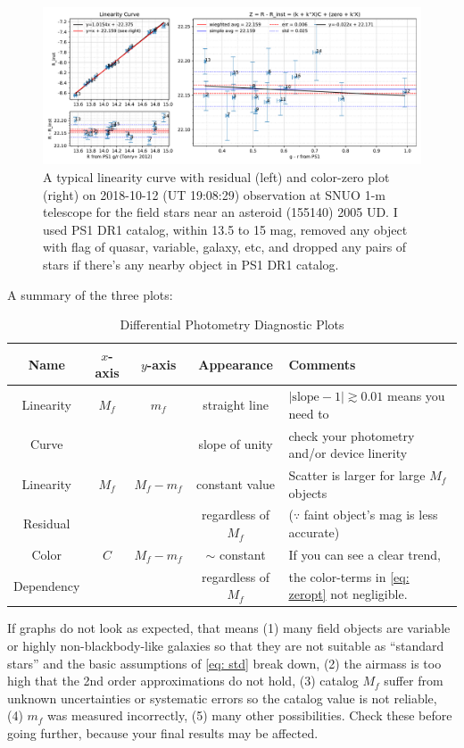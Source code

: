 \begin{figure}[ht!]
\centering
\includegraphics[width=\linewidth]{figs/SNUO_STX16803-2005UD-1-1-20181012-190829_zeropoint.pdf}
\caption{A typical linearity curve with residual (left) and color-zero plot (right) on 2018-10-12 (UT 19:08:29) observation at SNUO 1-m telescope for the field stars near an asteroid (155140) 2005 UD. I used PS1 DR1 catalog, within 13.5 to 15 mag, removed any object with flag of quasar, variable, galaxy, etc, and dropped any pairs of stars if there's any nearby object in PS1 DR1 catalog.}
\label{fig:zeropt}
\end{figure}

A summary of the three plots:
\begin{table}[ht!]
\caption{Differential Photometry Diagnostic Plots}
\label{tab: 1-filter diff phot}
\centering
  \begin{tabular}{c|cc|c|l}
  Name & $ x $-axis & $ y $-axis & Appearance & Comments \\
  \hline
  Linearity & $ M_f $ & $ m_f $       & straight line & 
  $ |\mathrm{slope} - 1| \gtrsim 0.01 $ means you need to \\
  Curve & & & slope of unity & check your photometry and/or device linerity \\
  \hline
  Linearity & $ M_f $ & $ M_f - m_f $ & constant value & 
  Scatter is larger for large $ M_f $ objects \\
  Residual & & & regardless of $ M_f $ & ($ \because $ faint object's mag is less accurate) \\
  \hline
  Color & $ C $  & $ M_f - m_f $ & $ \sim $ constant & 
  If you can see a clear trend, \\
  Dependency & & & regardless of $ M_f $ & the color-terms in \cref{eq: zeropt} not negligible.\\
\end{tabular}
\end{table}

If graphs do not look as expected, that means (1) many field objects are variable or highly non-blackbody-like galaxies so that they are not suitable as ``standard stars'' and the basic assumptions of \cref{eq: std} break down, (2) the airmass is too high that the 2nd order approximations do not hold, (3) catalog $ M_f $ suffer from unknown uncertainties or systematic errors so the catalog value is not reliable, (4) $ m_f $ was measured incorrectly, (5) many other possibilities. Check these before going further, because your final results may be affected.


